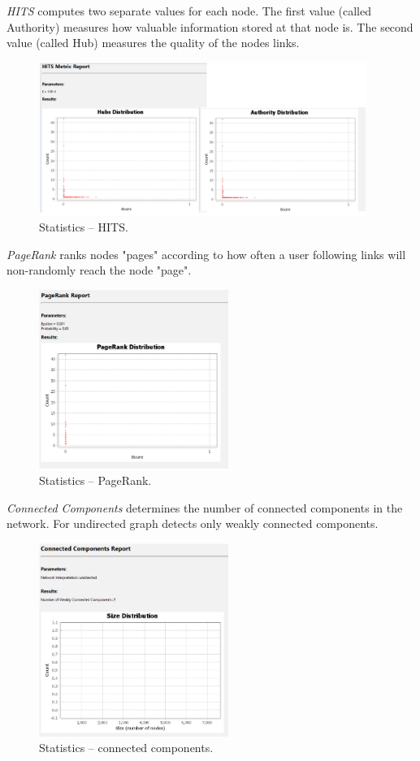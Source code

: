 \documentclass[12pt, a4paper]{article}
\begin{document}
\textit{HITS} computes two separate values for each node. The first value (called Authority) measures how valuable information stored at that node is. The second value (called Hub) measures the quality of the nodes links.
\begin{figure}[!h]
\centering
\includegraphics[width=0.95\textwidth]{s6p5.png}
\caption{Statistics -- HITS.}
\end{figure}

\newpage

\textit{PageRank} ranks nodes "pages" according to how often a user following links will non-randomly reach the node "page".
\begin{figure}[!h]
\centering
\includegraphics[width=0.55\textwidth]{s6p6.png}
\caption{Statistics -- PageRank.}
\end{figure}

\textit{Connected Components} determines the number of connected components in the network. For undirected graph detects only weakly connected components.
\begin{figure}[!h]
\centering
\includegraphics[width=0.55\textwidth]{s6p7.png}
\caption{Statistics -- connected components.}
\end{figure}
\end{document}

